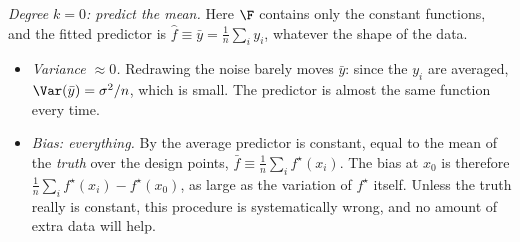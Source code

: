 \emph{Degree $k = 0$: predict the mean.} Here $\F$ contains only the constant
functions, and the fitted predictor is $\hat f \equiv \bar y = \tfrac1n \sum_i y_i$,
whatever the shape of the data.
\begin{itemize}
    \item \emph{Variance $\approx 0$.} Redrawing the noise barely moves $\bar
    y$: since the $y_i$ are averaged, $\Var(\bar y) = \sigma^2/n$, which
    is small. The predictor is almost the same function every time.
    \item \emph{Bias: everything.} By  the average predictor
    is constant, equal to the mean of the \emph{truth} over the design points,
    $\bar f \equiv \tfrac1n \sum_i f^\star(x_i)$. The bias at $x_0$ is therefore
    $\tfrac1n\sum_i f^\star(x_i) - f^\star(x_0)$, as large as the variation of
    $f^\star$ itself. Unless the
    truth really is constant, this procedure is systematically wrong, and no amount of
    extra data will help.
\end{itemize}

